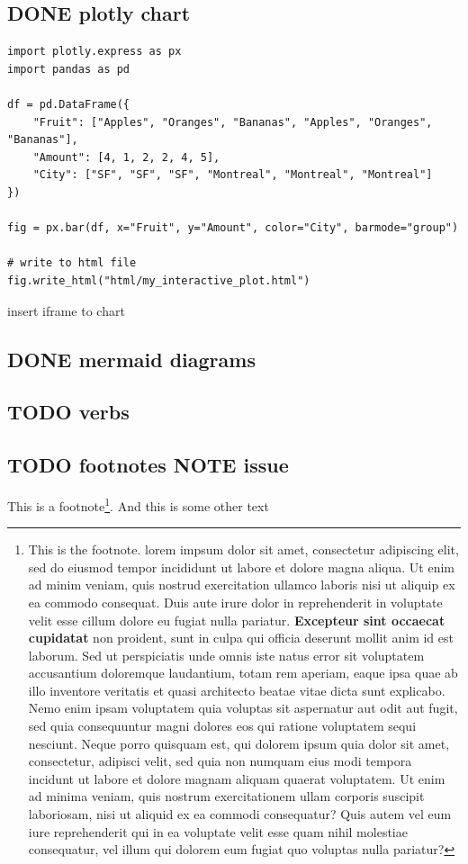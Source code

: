\documentclass[11pt]{article}
\begin{document}
\subsection{{\bfseries\sffamily DONE} plotly chart}
\label{sec:org7f63d43}
\begin{verbatim}
import plotly.express as px
import pandas as pd

df = pd.DataFrame({
    "Fruit": ["Apples", "Oranges", "Bananas", "Apples", "Oranges", "Bananas"],
    "Amount": [4, 1, 2, 2, 4, 5],
    "City": ["SF", "SF", "SF", "Montreal", "Montreal", "Montreal"]
})

fig = px.bar(df, x="Fruit", y="Amount", color="City", barmode="group")

# write to html file
fig.write_html("html/my_interactive_plot.html")
\end{verbatim}

insert iframe to chart
\subsection{{\bfseries\sffamily DONE} mermaid diagrams}
\label{sec:orged0df6e}
\begin{center}

\label{orga62c09e}
\end{center}
\subsection{{\bfseries\sffamily TODO} verbs}
\label{sec:org51f3ec8}
\subsection{{\bfseries\sffamily TODO} footnotes NOTE issue}
\label{sec:org49b67ef}
This is a footnote\footnote{This is the footnote.  lorem impsum dolor sit amet, consectetur adipiscing elit, sed do eiusmod tempor incididunt ut labore et dolore magna aliqua. Ut enim ad minim veniam, quis nostrud exercitation ullamco laboris nisi ut aliquip ex ea commodo consequat. Duis aute irure dolor in reprehenderit in voluptate velit esse cillum dolore eu fugiat nulla pariatur. \textbf{Excepteur sint occaecat cupidatat} non proident, sunt in culpa qui officia deserunt mollit anim id est laborum.  Sed ut perspiciatis unde omnis iste natus error sit voluptatem accusantium doloremque laudantium, totam rem aperiam, eaque ipsa quae ab illo inventore veritatis et quasi architecto beatae vitae dicta sunt explicabo. Nemo enim ipsam voluptatem quia voluptas sit aspernatur aut odit aut fugit, sed quia consequuntur magni dolores eos qui ratione voluptatem sequi nesciunt. Neque porro quisquam est, qui dolorem ipsum quia dolor sit amet, consectetur, adipisci velit, sed quia non numquam eius modi tempora incidunt ut labore et dolore magnam aliquam quaerat voluptatem. Ut enim ad minima veniam, quis nostrum exercitationem ullam corporis suscipit laboriosam, nisi ut aliquid ex ea commodi consequatur? Quis autem vel eum iure reprehenderit qui in ea voluptate velit esse quam nihil molestiae consequatur, vel illum qui dolorem eum fugiat quo voluptas nulla pariatur?}.  And this is some other text
\end{document}

